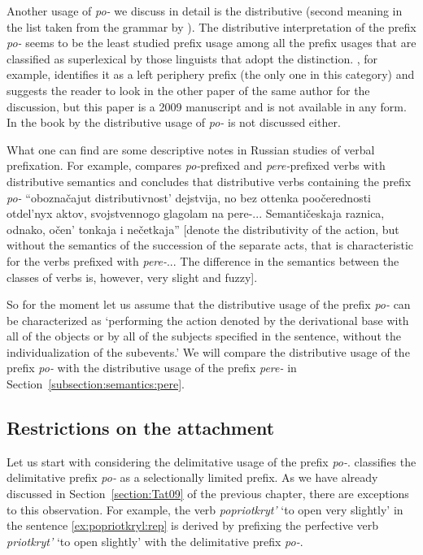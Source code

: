 Another usage of \textit{po-} we discuss in detail is the distributive (second meaning in the list taken from the grammar by \citealt{Shvedova:82}). The distributive interpretation of the prefix \textit{po-} seems to be the least studied prefix usage among all the prefix usages that are classified as superlexical by those linguists that adopt the distinction. \citet{Tatevosov:09}, for example, identifies it as a left periphery prefix (the only one in this category) and suggests the reader to look in the other paper of the same author for the discussion, but this paper is a 2009 manuscript and is not available in any form. In the book by \citet{Kagan:book} the distributive usage of \textit{po-} is not discussed either. 

What one can find are some descriptive notes in Russian studies of verbal prefixation. For example, \citet[289--290]{Isachenko:60} compares \textit{po-}prefixed and \textit{pere-}prefixed verbs with distributive semantics and concludes that distributive verbs containing the prefix \textit{po-} ``obozna\v{c}ajut distributivnost' dejstvija, no bez ottenka poo\v{c}erednosti otdel'nyx aktov, svojstvennogo glagolam na pere-... Semanti\v{c}eskaja raznica, odnako, o\v{c}en' tonkaja i ne\v{c}etkaja'' [denote the distributivity of the action, but without the semantics of the succession of the separate acts, that is characteristic for the verbs prefixed with \textit{pere-}... The difference in the semantics between the classes of verbs is, however, very slight and fuzzy].

So for the moment let us assume that the distributive usage of the prefix \textit{po-} can be characterized as `performing the action denoted by the derivational base with all of the objects or by all of the subjects specified in the sentence, without the individualization of the subevents.' We will compare the distributive usage of the prefix \textit{po-} with the distributive usage of the prefix \textit{pere-} in Section~\ref{subsection:semantics:pere}.

\subsection{Restrictions on the attachment} 
Let us start with considering the delimitative usage of the prefix \textit{po-}. \citet{Tatevosov:09} classifies the delimitative prefix \textit{po-} as a selectionally limited prefix. As we have already discussed in Section~\ref{section:Tat09} of the previous chapter, there are exceptions to this observation. For example, the verb \textit{popriotkryt'} `to open very slightly' in the sentence \ref{ex:popriotkryl:rep} is derived by prefixing the perfective verb \textit{priotkryt'} `to open slightly' with the delimitative prefix \textit{po-}.

